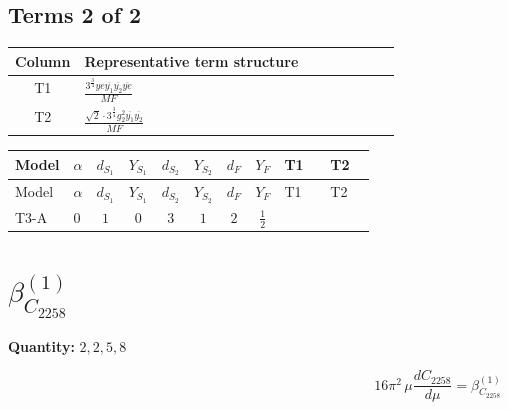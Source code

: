 \documentclass[8pt]{article}
\begin{document}
\begin{landscape}
\subsection*{Terms 2 of 2}
\begin{center}
\begin{tabular}{@{}c >{\raggedright\arraybackslash}p{0.82\linewidth}@{}}
\toprule
Column & Representative term structure \\
\midrule
T1 & \(\displaystyle \frac{3^{\frac{3}{4}} ye \overline{y_{1}} \overline{y_{2}} \overline{ye}}{MF}\) \\
\midrule
T2 & \(\displaystyle \frac{\sqrt{2} \cdot 3^{\frac{3}{4}} g_{2}^{2} \overline{y_{1}} \overline{y_{2}}}{MF}\) \\
\midrule
\bottomrule
\end{tabular}
\end{center}
\smallskip
\tiny
\begin{longtable}{@{}llcccccc >{\raggedright\arraybackslash}p{0.21\linewidth} >{\raggedright\arraybackslash}p{0.21\linewidth}@{}}
\toprule
Model & $\alpha$ & $d_{S_1}$ & $Y_{S_1}$ & $d_{S_2}$ & $Y_{S_2}$ & $d_F$ & $Y_F$ & T1 & T2 \\
\midrule
\endfirsthead
\toprule
Model & $\alpha$ & $d_{S_1}$ & $Y_{S_1}$ & $d_{S_2}$ & $Y_{S_2}$ & $d_F$ & $Y_F$ & T1 & T2 \\
\midrule
\endhead
T3-A & $0$ & $1$ & $0$ & $3$ & $1$ & $2$ & $\frac{1}{2}$ & \scriptsize\adjustbox{max width=\linewidth}{$\begin{gathered} - \frac{3^{\frac{3}{4}} ye \overline{y_{1}} \overline{y_{2}} \overline{ye}}{12 MF}\end{gathered}$} & \scriptsize\adjustbox{max width=\linewidth}{$\begin{gathered} \frac{\sqrt{2} \cdot 3^{\frac{3}{4}} g_{2}^{2} \overline{y_{1}} \overline{y_{2}}}{3 MF}\end{gathered}$} \\
\midrule
\bottomrule
\end{longtable}
\clearpage
\section*{$\beta_{C_{2258}}^{(1)}$}
\noindent\textbf{Quantity: }$\mathrm{2,2,5,8}$\par\smallskip
\[16\pi^2\,\mu\frac{d C_{2258}}{d\mu}=\beta_{C_{2258}}^{(1)}\]

\end{landscape}
\end{document}
